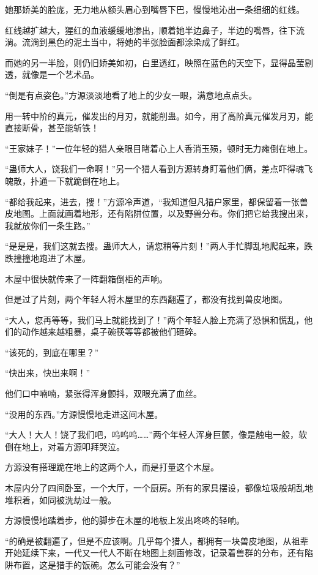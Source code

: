\begin{this_body}
她那娇美的脸庞，无力地从额头眉心到嘴唇下巴，慢慢地沁出一条细细的红线。

红线越扩越大，猩红的血液缓缓地渗出，顺着她半边鼻子，半边的嘴唇，往下流淌。流淌到黑色的泥土当中，将她的半张脸面都涂染成了鲜红。

而她的另一半脸，则仍旧娇美如初，白里透红，映照在蓝色的天空下，显得晶莹剔透，就像是一个艺术品。

“倒是有点姿色。”方源淡淡地看了地上的少女一眼，满意地点点头。

用一转中阶的真元，催发出的月刃，就能削蛊。如今，用了高阶真元催发月刃，能直接断骨，甚至能斩铁！

“王家妹子！”一位年轻的猎人亲眼目睹着心上人香消玉殒，顿时无力瘫倒在地上。

“蛊师大人，饶我们一命啊！”另一个猎人看到方源转身盯着他们俩，差点吓得魂飞魄散，扑通一下就跪倒在地上。

“都给我起来，进去，搜！”方源冷声道，“我知道但凡猎户家里，都保留着一张兽皮地图。上面就画着地形，还有陷阱位置，以及野兽分布。你们把它给我搜出来，我就放你们一条生路。”

“是是是，我们这就去搜。蛊师大人，请您稍等片刻！”两人手忙脚乱地爬起来，跌跌撞撞地跑进了木屋。

木屋中很快就传来了一阵翻箱倒柜的声响。

但是过了片刻，两个年轻人将木屋里的东西翻遍了，都没有找到兽皮地图。

“大人，您再等等，我们马上就能找到了！”两个年轻人脸上充满了恐惧和慌乱，他们的动作越来越粗暴，桌子碗筷等等都被他们砸碎。

“该死的，到底在哪里？”

“快出来，快出来啊！”

他们口中喃喃，紧张得浑身颤抖，双眼充满了血丝。

“没用的东西。”方源慢慢地走进这间木屋。

“大人！大人！饶了我们吧，呜呜呜……”两个年轻人浑身巨颤，像是触电一般，软倒在地上，对着方源叩拜哭泣。

方源没有搭理跪在地上的这两个人，而是打量这个木屋。

木屋内分了四间卧室，一个大厅，一个厨房。所有的家具摆设，都像垃圾般胡乱地堆积着，如同被洗劫过一般。

方源慢慢地踏着步，他的脚步在木屋的地板上发出咚咚的轻响。

“的确是被翻遍了，但是不应该啊。几乎每个猎人，都拥有一块兽皮地图，从祖辈开始延续下来，一代又一代人不断在地图上刻画修改，记录着兽群的分布，还有陷阱布置，这是猎手的饭碗。怎么可能会没有？”


\end{this_body}
